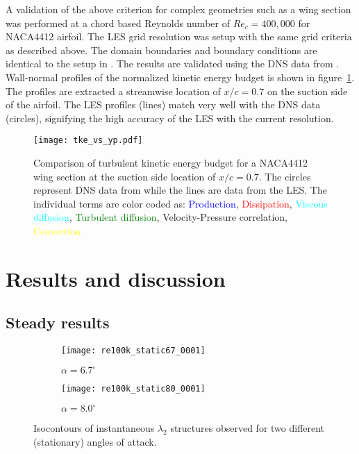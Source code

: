 A validation of the above criterion for complex geometries such as a wing section was performed at a chord based Reynolds number of $Re_{c}=400,000$ for NACA4412 airfoil. The LES grid resolution was setup with the same grid criteria as described above. The domain boundaries and boundary conditions are identical to the setup in \cite{hosseini16}. The results are validated using the DNS data from \cite{hosseini16}. Wall-normal profiles of the normalized kinetic energy budget is shown in figure~\ref{fig:wing_budget}. The profiles are extracted a streamwise location of $x/c=0.7$ on the suction side of the airfoil. The LES profiles (lines) match very well with the DNS data (circles), signifying the high accuracy of the LES with the current resolution.
\begin{figure}[h]
	\centering
	\texttt{[image: tke\_vs\_yp.pdf]}
	\caption{Comparison of turbulent kinetic energy budget for a NACA4412 wing section at the suction side location of $x/c=0.7$. The circles represent DNS data from \cite{hosseini16} while the lines are data from the LES. The individual terms are color coded as: \textcolor{blue}{Production}, \textcolor{red}{Dissipation}, \textcolor{cyan}{Viscous diffusion}, \textcolor{green}{Turbulent diffusion}, \textcolor{mygray}{Velocity-Pressure correlation}, \textcolor{yellow}{Convection}}
	\label{fig:wing_budget}
\end{figure}
\section{Results and discussion}
\subsection{Steady results}
\begin{figure}[t]
	\begin{subfigure}[b]{0.49\textwidth}
		\centering
		\texttt{[image: re100k\_static67\_0001]}
		\caption{$\alpha=6.7^{\circ}$}
		\label{fig:aoa67_iso}
	\end{subfigure}
	\begin{subfigure}[b]{0.49\textwidth}
		\centering
		\texttt{[image: re100k\_static80\_0001]}
		\caption{$\alpha=8.0^{\circ}$}
		\label{fig:aoa80_iso}
	\end{subfigure}
	\caption{Isocontours of instantaneous $\lambda_{2}$ structures observed for two different (stationary) angles of attack.}
	\label{fig:isocontour_aoa}
\end{figure}

